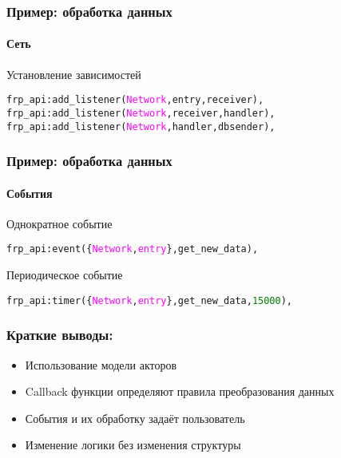 \documentclass[10pt,pdf,hyperref={unicode},aspectratio=169]{beamer}
\begin{document}
\begin{frame}[fragile]

 \frametitle{Пример: обработка данных}
 \framesubtitle{Сеть}

\begin{block}{Установление зависимостей}
\fontsize{7pt}{7pt}\selectfont
\begin{alltt}
frp_api:add_listener(\textcolor{magenta}{Network}, entry, receiver),
frp_api:add_listener(\textcolor{magenta}{Network}, receiver, handler),
frp_api:add_listener(\textcolor{magenta}{Network}, handler, dbsender),
\end{alltt}

\end{block} 

\end{frame}

\begin{frame}[fragile]
 \frametitle{Пример: обработка данных}
 \framesubtitle{События}

\begin{block}{Однократное событие}
\fontsize{8pt}{8pt}\selectfont
\begin{alltt}
frp_api:event(\{\textcolor{magenta}{Network}, \textcolor{magenta}{entry}\}, get_new_data),
\end{alltt}
\end{block}

\begin{block}{Периодическое событие}
\fontsize{8pt}{8pt}\selectfont
\begin{alltt}
frp_api:timer(\{{\textcolor{magenta}{Network}, \textcolor{magenta}{entry}}\}, get_new_data, \textcolor{green}{15000}),
\end{alltt}
\end{block}
\end{frame}

\begin{frame}
\frametitle{Краткие выводы:}
\begin{itemize}
\item Использование модели акторов
\item Callback функции определяют правила преобразования данных 
\item События и их обработку задаёт пользователь
\item Изменение логики без изменения структуры
\end{itemize}
\end{frame}
\end{document}
